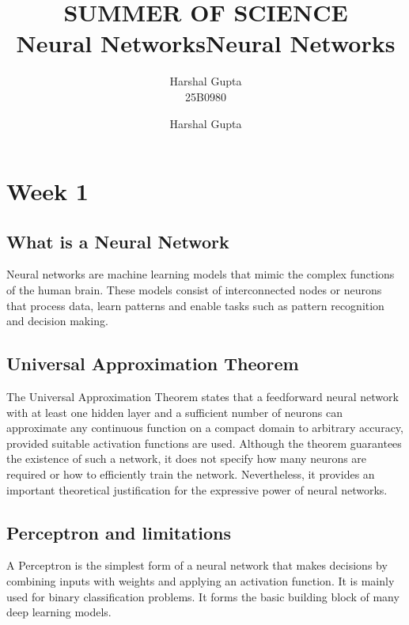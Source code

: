 \documentclass[12pt]{article}
\begin{document}
\usetikzlibrary{arrows.meta, positioning}

\title{SUMMER OF SCIENCE \\ Neural Networks}
\author{Harshal Gupta \\ 25B0980}
\date{}
\maketitle
\tableofcontents
\clearpage 
\thispagestyle{fancy}

\title{Neural Networks}
\author{Harshal Gupta}
\date{}
\section{Week 1}
\subsection{What is a Neural Network}
Neural networks are machine learning models that mimic the complex functions of the human brain. These models consist of interconnected nodes or neurons that process data, learn patterns and enable tasks such as pattern recognition and decision making.
\\ 
\subsection{Universal Approximation Theorem}
The Universal Approximation Theorem states that a feedforward neural network with at least one hidden layer and a sufficient number of neurons can approximate any continuous function on a compact domain to arbitrary accuracy, provided suitable activation functions are used. Although the theorem guarantees the existence of such a network, it does not specify how many neurons are required or how to efficiently train the network. Nevertheless, it provides an important theoretical justification for the expressive power of neural networks.
\subsection{Perceptron and limitations}
A Perceptron is the simplest form of a neural network that makes decisions by combining inputs with weights and applying an activation function. It is mainly used for binary classification problems. It forms the basic building block of many deep learning models.
\end{document}
